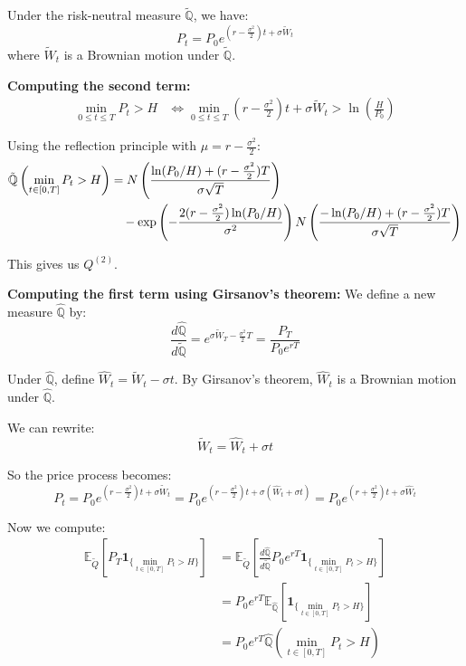 \documentclass{article}
\begin{document}
Under the risk-neutral measure $\tilde{\mathbb{Q}}$, we have:
\begin{equation}
P_t = P_0 e^{(r - \frac{\sigma^2}{2})t + \sigma \tilde{W}_t}
\end{equation}
where $\tilde{W}_t$ is a Brownian motion under $\tilde{\mathbb{Q}}$.

\textbf{Computing the second term:}
\begin{align}
\min_{0 \leq t \leq T} P_t > H &\Leftrightarrow \min_{0 \leq t \leq T} \left(r - \frac{\sigma^2}{2}\right)t + \sigma \tilde{W}_t > \ln\left(\frac{H}{P_0}\right)
\end{align}

Using the reflection principle with $\mu = r - \frac{\sigma^2}{2}$:
\begin{align}
\tilde{\mathbb{Q}}\left(\min_{t \in [0,T]} P_t > H\right) &= N\left(\frac{\ln(P_0/H) + (r - \frac{\sigma^2}{2})T}{\sigma\sqrt{T}}\right) \notag\\
&\quad - \exp\left(-\frac{2(r - \frac{\sigma^2}{2})\ln(P_0/H)}{\sigma^2}\right) N\left(\frac{-\ln(P_0/H) + (r - \frac{\sigma^2}{2})T}{\sigma\sqrt{T}}\right)
\end{align}

This gives us $Q^{(2)}$.

\textbf{Computing the first term using Girsanov's theorem:}
We define a new measure $\hat{\mathbb{Q}}$ by:
\begin{equation}
\frac{d\hat{\mathbb{Q}}}{d\tilde{\mathbb{Q}}} = e^{\sigma \tilde{W}_T - \frac{\sigma^2}{2}T} = \frac{P_T}{P_0 e^{rT}}
\end{equation}

Under $\hat{\mathbb{Q}}$, define $\hat{W}_t = \tilde{W}_t - \sigma t$. By Girsanov's theorem, $\hat{W}_t$ is a Brownian motion under $\hat{\mathbb{Q}}$.

We can rewrite:
\begin{equation}
\tilde{W}_t = \hat{W}_t + \sigma t
\end{equation}

So the price process becomes:
\begin{equation}
P_t = P_0 e^{(r - \frac{\sigma^2}{2})t + \sigma \tilde{W}_t} = P_0 e^{(r - \frac{\sigma^2}{2})t + \sigma(\hat{W}_t + \sigma t)} = P_0 e^{(r + \frac{\sigma^2}{2})t + \sigma\hat{W}_t}
\end{equation}

Now we compute:
\begin{align}
\mathbb{E}_{\tilde{Q}}\left[P_T \mathbf{1}_{\{\min_{t \in [0,T]} P_t > H\}}\right] &= \mathbb{E}_{\tilde{Q}}\left[\frac{d\hat{\mathbb{Q}}}{d\tilde{\mathbb{Q}}} P_0 e^{rT} \mathbf{1}_{\{\min_{t \in [0,T]} P_t > H\}}\right]\\
&= P_0 e^{rT} \mathbb{E}_{\hat{\mathbb{Q}}}\left[\mathbf{1}_{\{\min_{t \in [0,T]} P_t > H\}}\right]\\
&= P_0 e^{rT} \hat{\mathbb{Q}}\left(\min_{t \in [0,T]} P_t > H\right)
\end{align}
\end{document}
